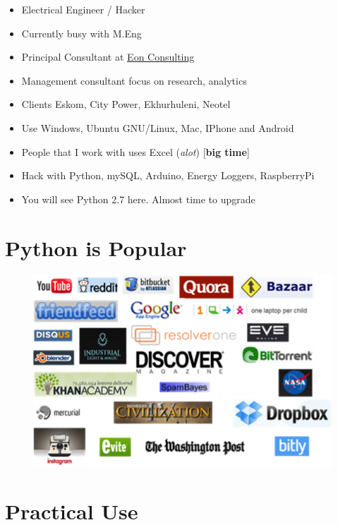\documentclass{article}
\begin{document}
\begin{itemize}
\item
  Electrical Engineer / Hacker
\item
  Currently busy with M.Eng
\item
  Principal Consultant at
  \href{http://www.eon.co.za/index.php/our-services-main/our-services/business-analytics}{Eon
  Consulting}
\item
  Management consultant focus on research, analytics
\item
  Clients Eskom, City Power, Ekhurhuleni, Neotel
\item
  Use Windows, Ubuntu GNU/Linux, Mac, IPhone and Android
\item
  People that I work with uses Excel (\emph{alot}) {[}\textbf{big
  time}{]}
\item
  Hack with Python, mySQL, Arduino, Energy Loggers, RaspberryPi
\item
  You will see Python 2.7 here. Almost time to upgrade
\end{itemize}

    \section{Python is Popular}

\begin{figure}[htbp]
\centering
\includegraphics{static/img/python_companies2.png}
\end{figure}

    \section{Practical Use}
\end{document}
